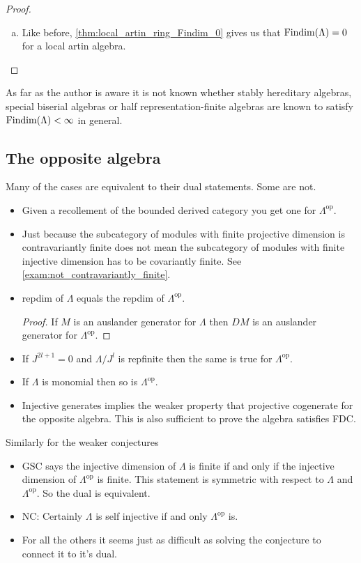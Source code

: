 \begin{theorem}
\begin{proof}
\begin{enumerate}[(a)]
			\item Like before, \cref{thm:local_artin_ring_Findim_0} gives us that $\operatorname{Findim}(\Lambda)=0$ for a local artin algebra.
		\end{enumerate}
	\end{proof}
\end{theorem}

As far as the author is aware it is not known whether stably hereditary algebras, special biserial algebras or half representation-finite algebras are known to satisfy $\operatorname{Findim}(\Lambda) < \infty$ in general.

\subsection{The opposite algebra}

Many of the cases are equivalent to their dual statements. Some are not.
\begin{itemize}
	\item Given a recollement of the bounded derived category you get one for $\Lambda^{\operatorname{op}}$. 
	\item Just because the subcategory of modules with finite projective dimension is contravariantly finite does not mean the subcategory of modules with finite injective dimension has to be covariantly finite. See \cref{exam:not_contravariantly_finite}.
	\item repdim of $\Lambda$ equals the repdim of $\Lambda^{\operatorname{op}}$.
	\begin{proof}
		If $M$ is an auslander generator for $\Lambda$ then $DM$ is an auslander generator for $\Lambda^{\operatorname{op}}$.
	\end{proof}
	\item If $J^{2l+1} = 0$ and $\Lambda/J^l$ is repfinite then the same is true for $\Lambda^{\operatorname{op}}$.
	\item If $\Lambda$ is monomial then so is $\Lambda^{\operatorname{op}}$.
	\item Injective generates implies the weaker property that projective cogenerate for the opposite algebra. This is also sufficient to prove the algebra satisfies FDC.\cite[Section~5]{Rick19} 
\end{itemize}

Similarly for the weaker conjectures
\begin{itemize}
	\item GSC says the injective dimension of $\Lambda$ is finite if and only if the injective dimension of $\Lambda^{\operatorname{op}}$ is finite. This statement is symmetric with respect to $\Lambda$ and $\Lambda^{\operatorname{op}}$. So the dual is equivalent.
	\item NC: Certainly $\Lambda$ is self injective if and only $\Lambda^{\operatorname{op}}$ is. 
	\item For all the others it seems just as difficult as solving the conjecture to connect it to it's dual.
\end{itemize}
